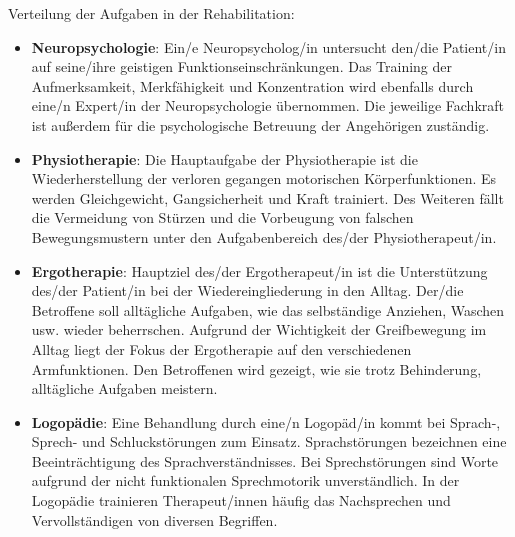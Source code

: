 Verteilung der Aufgaben in der Rehabilitation: \cite{haring:2014:insult}
\begin{itemize}
    \item \textbf{Neuropsychologie}: Ein/e Neuropsycholog/in untersucht den/die Patient/in auf seine/ihre geistigen Funktionseinschränkungen. Das Training der Aufmerksamkeit, Merkfähigkeit und Konzentration wird ebenfalls durch eine/n Expert/in der Neuropsychologie übernommen. Die jeweilige Fachkraft ist außerdem für die psychologische Betreuung der Angehörigen zuständig.
    
    \item \textbf{Physiotherapie}: Die Hauptaufgabe der Physiotherapie ist die Wiederherstellung der verloren gegangen motorischen Körperfunktionen. Es werden Gleichgewicht, Gangsicherheit und Kraft trainiert. Des Weiteren fällt die Vermeidung von Stürzen und die Vorbeugung von falschen Bewegungsmustern unter den Aufgabenbereich des/der Physiotherapeut/in.
    
    \item \textbf{Ergotherapie}: Hauptziel des/der Ergotherapeut/in ist die Unterstützung des/der Patient/in bei der Wiedereingliederung in den Alltag. Der/die Betroffene soll alltägliche Aufgaben, wie das selbständige Anziehen, Waschen \ac{usw.} wieder beherrschen. Aufgrund der Wichtigkeit der Greifbewegung im Alltag liegt der Fokus der Ergotherapie auf den verschiedenen Armfunktionen. Den Betroffenen wird gezeigt, wie sie trotz Behinderung, alltägliche Aufgaben meistern.
    
    \item \textbf{Logopädie}: Eine Behandlung durch eine/n Logopäd/in kommt bei Sprach-, Sprech- und Schluckstörungen zum Einsatz. Sprachstörungen bezeichnen eine Beeinträchtigung des Sprachverständnisses. Bei Sprechstörungen sind Worte aufgrund der nicht funktionalen Sprechmotorik unverständlich. In der Logopädie trainieren Therapeut/innen häufig das Nachsprechen und Vervollständigen von diversen Begriffen.
\end{itemize}



